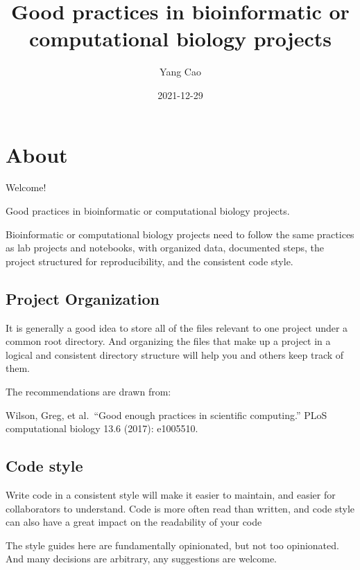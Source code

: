 \documentclass[
]{book}
\title{Good practices in bioinformatic or computational biology projects}
\author{Yang Cao}
\date{2021-12-29}
\begin{document}
\maketitle

{
\setcounter{tocdepth}{1}
\tableofcontents
}
\hypertarget{about}{%
\chapter*{About}\label{about}}

Welcome!

Good practices in bioinformatic or computational biology projects.

Bioinformatic or computational biology projects need to follow the same
practices as lab projects and notebooks, with organized data, documented steps,
the project structured for reproducibility, and the consistent code style.

\hypertarget{project-organization}{%
\section*{Project Organization}\label{project-organization}}

It is generally a good idea to store all of the files relevant to one project
under a common root directory. And organizing the files that make up a project
in a logical and consistent directory structure will help you and others keep
track of them.

The recommendations are drawn from:

Wilson, Greg, et al.~``Good enough practices in scientific computing.'' PLoS computational biology 13.6 (2017): e1005510.

\hypertarget{code-style}{%
\section*{Code style}\label{code-style}}

Write code in a consistent style will make it easier to maintain, and easier
for collaborators to understand. Code is more often read than written, and code
style can also have a great impact on the readability of your code

The style guides here are fundamentally opinionated, but not too opinionated.
And many decisions are arbitrary, any suggestions are welcome.
\end{document}
